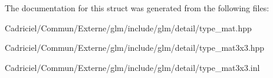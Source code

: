 The documentation for this struct was generated from the following files\+:\begin{DoxyCompactItemize}
\item 
Cadriciel/\+Commun/\+Externe/glm/include/glm/detail/type\+\_\+mat.\+hpp\item 
Cadriciel/\+Commun/\+Externe/glm/include/glm/detail/type\+\_\+mat3x3.\+hpp\item 
Cadriciel/\+Commun/\+Externe/glm/include/glm/detail/type\+\_\+mat3x3.\+inl\end{DoxyCompactItemize}
